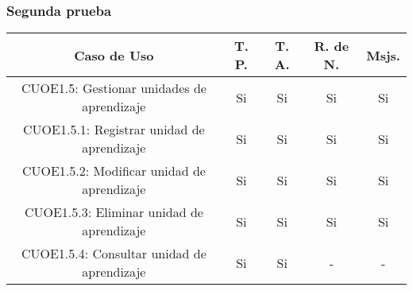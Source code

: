 \subsubsection{Segunda prueba}
\begin{center}
	\begin{tabular}{ |c|c|c|c|c| } 
		\hline
		Caso de Uso & T. P. & T. A. & R. de N. & Msjs. \\
		\hline 
		CUOE1.5: Gestionar unidades de aprendizaje & Si & Si & Si & Si \\ 
		CUOE1.5.1: Registrar unidad de aprendizaje & Si & Si & Si & Si \\ 
		CUOE1.5.2: Modificar unidad de aprendizaje & Si & Si & Si & Si \\ 
		CUOE1.5.3: Eliminar unidad de aprendizaje & Si & Si & Si & Si \\ 
		CUOE1.5.4: Consultar unidad de aprendizaje & Si & Si & - & - \\ 
		\hline
	\end{tabular}
\end{center}
